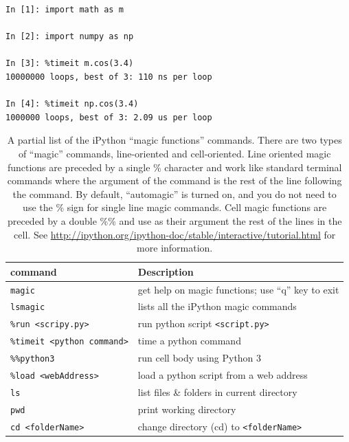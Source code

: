 \begin{lstlisting}[style = pythonSnippet]
In [1]: import math as m

In [2]: import numpy as np

In [3]: %timeit m.cos(3.4)
10000000 loops, best of 3: 110 ns per loop

In [4]: %timeit np.cos(3.4)
1000000 loops, best of 3: 2.09 us per loop
\end{lstlisting}


\begin{table}
\centering
\caption{A partial list of the iPython ``magic functions'' commands. There are two types of ``magic'' commands, line-oriented and cell-oriented. Line oriented magic functions are preceded by a single \% character and work like standard terminal commands where the argument of the command is the rest of the line following the command. By default, ``automagic'' is turned on, and you do not need to use the \% sign for single line magic commands. Cell magic functions are preceded by a double \%\% and use as their argument the rest of the lines in the cell. See  \href{http://ipython.org/ipython-doc/stable/interactive/tutorial.html}
{http://ipython.org/ipython-doc/stable/interactive/tutorial.html} for more information.  
}
\label{tab:iPythonMagic}       %
\begin{tabular}{ll}
\toprule
command\hspace*{7mm} & Description  \\
\midrule

\texttt{magic} 	&	get help on magic functions; use ``q'' key to exit\\
\texttt{lsmagic} 	&	lists all the iPython magic commands\\
\texttt{\%run <scripy.py>} 	&	run python script \texttt{<script.py>}\\
\texttt{\%timeit <python command>} 	&	time a python command\\
\texttt{\%\%python3} &	run cell body using Python 3\\
\texttt{\%load <webAddress>} &	load a python script from a web address\\
\texttt{ls} 	&	list files \& folders in current directory\\
\texttt{pwd} 	&	print working directory\\
\texttt{cd <folderName>} 	& change directory (cd) to \texttt{<folderName>} \\

\bottomrule

\end{tabular}
\end{table}
%

